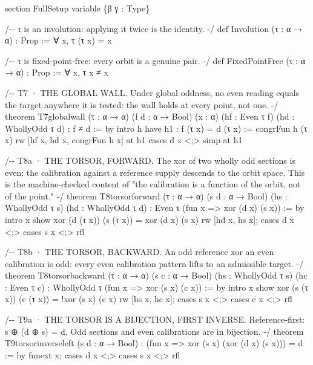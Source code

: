 \documentclass[10pt]{article}
\renewcommand{\_}{\origunderscore\allowbreak}
\newenvironment{Shaded}{}{}
\newcommand{\NormalTok}[1]{#1}
\begin{document}
\begin{Shaded}
\begin{Highlighting}[]
\NormalTok{section FullSetup}
\NormalTok{variable \{β γ : Type\}}

\NormalTok{/{-}{-} τ is an involution: applying it twice is the identity. {-}/}
\NormalTok{def Involution (τ : α → α) : Prop := ∀ x, τ (τ x) = x}

\NormalTok{/{-}{-} τ is fixed{-}point{-}free: every orbit is a genuine pair. {-}/}
\NormalTok{def FixedPointFree (τ : α → α) : Prop := ∀ x, τ x ≠ x}

\NormalTok{/{-}{-} T7 · THE GLOBAL WALL. Under global oddness, no even reading equals the}
\NormalTok{    target anywhere it is tested: the wall holds at every point, not one. {-}/}
\NormalTok{theorem T7\_global\_wall (τ : α → α) (f d : α → Bool) (x : α)}
\NormalTok{    (hf : Even τ f) (hd : WhollyOdd τ d) : f ≠ d := by}
\NormalTok{  intro h}
\NormalTok{  have h1 : f (τ x) = d (τ x) := congrFun h (τ x)}
\NormalTok{  rw [hf x, hd x, congrFun h x] at h1}
\NormalTok{  cases d x \textless{};\textgreater{} simp at h1}

\NormalTok{/{-}{-} T8a · THE TORSOR, FORWARD. The xor of two wholly odd sections is even:}
\NormalTok{    the calibration against a reference supply descends to the orbit space.}
\NormalTok{    This is the machine{-}checked content of "the calibration is a function}
\NormalTok{    of the orbit, not of the point." {-}/}
\NormalTok{theorem T8\_torsor\_forward (τ : α → α) (s d : α → Bool)}
\NormalTok{    (hs : WhollyOdd τ s) (hd : WhollyOdd τ d) :}
\NormalTok{    Even τ (fun x =\textgreater{} xor (d x) (s x)) := by}
\NormalTok{  intro x}
\NormalTok{  show xor (d (τ x)) (s (τ x)) = xor (d x) (s x)}
\NormalTok{  rw [hd x, hs x]; cases d x \textless{};\textgreater{} cases s x \textless{};\textgreater{} rfl}

\NormalTok{/{-}{-} T8b · THE TORSOR, BACKWARD. An odd reference xor an even calibration}
\NormalTok{    is odd: every even calibration pattern lifts to an admissible target. {-}/}
\NormalTok{theorem T8\_torsor\_backward (τ : α → α) (s c : α → Bool)}
\NormalTok{    (hs : WhollyOdd τ s) (hc : Even τ c) :}
\NormalTok{    WhollyOdd τ (fun x =\textgreater{} xor (s x) (c x)) := by}
\NormalTok{  intro x}
\NormalTok{  show xor (s (τ x)) (c (τ x)) = !xor (s x) (c x)}
\NormalTok{  rw [hs x, hc x]; cases s x \textless{};\textgreater{} cases c x \textless{};\textgreater{} rfl}

\NormalTok{/{-}{-} T9a · THE TORSOR IS A BIJECTION, FIRST INVERSE. Reference{-}first:}
\NormalTok{    s ⊕ (d ⊕ s) = d. Odd sections and even calibrations are in bijection. {-}/}
\NormalTok{theorem T9\_torsor\_inverse\_left (s d : α → Bool) :}
\NormalTok{    (fun x =\textgreater{} xor (s x) (xor (d x) (s x))) = d := by}
\NormalTok{  funext x; cases d x \textless{};\textgreater{} cases s x \textless{};\textgreater{} rfl}


\end{Highlighting}
\end{Shaded}
\end{document}
